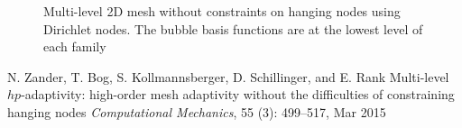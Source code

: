 \begin{frame}
\begin{figure}
\begin{center}
	\end{center}
	\caption{\alert{Multi-level} 2D mesh without constraints on hanging nodes using Dirichlet nodes. The bubble basis functions are at the \alert{lowest level} of each family \label{fig:Multilevel}}
	\end{figure}
	\vfill
	\begin{thebibliography}{10}
	\beamertemplatearticlebibitems
	\scriptsize
	N. Zander, T. Bog, S. Kollmannsberger, D. Schillinger, and E. Rank
	\newblock Multi-level $hp$-adaptivity: high-order mesh adaptivity without the
  	difficulties of constraining hanging nodes
	\newblock \emph{Computational Mechanics}, 55 (3): 499--517,
  	Mar 2015
	\end{thebibliography}
\end{frame}